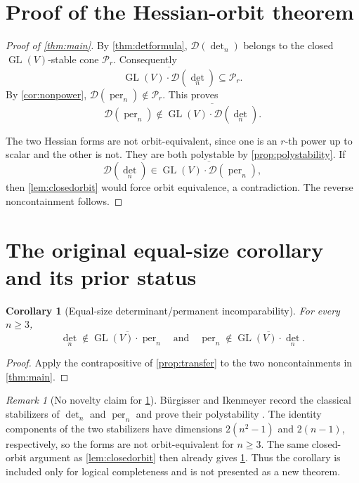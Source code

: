 \documentclass[11pt]{article}
\newtheorem{corollary}[theorem]{Corollary}
\theoremstyle{remark}
\newtheorem{remark}[theorem]{Remark}
\DeclareMathOperator{\per}{per}
\DeclareMathOperator{\GL}{GL}
\newcommand{\Dcal}{\mathcal D}
\begin{document}
\section{Proof of the Hessian-orbit theorem}
\begin{proof}[Proof of \cref{thm:main}]
By \cref{thm:detformula}, $\Dcal(\det_n)$ belongs to the closed $\GL(V)$-stable cone $\mathcal P_r$.  Consequently
\[
 \overline{\GL(V)\cdot\Dcal(\det_n)}\subseteq\mathcal P_r.
\]
By \cref{cor:nonpower}, $\Dcal(\per_n)\notin\mathcal P_r$.  This proves
\[
 \Dcal(\per_n)\notin\overline{\GL(V)\cdot\Dcal(\det_n)}.
\]

The two Hessian forms are not orbit-equivalent, since one is an $r$-th power up to scalar and the other is not.  They are both polystable by \cref{prop:polystability}.  If
\[
 \Dcal(\det_n)\in\overline{\GL(V)\cdot\Dcal(\per_n)},
\]
then \cref{lem:closedorbit} would force orbit equivalence, a contradiction.  The reverse noncontainment follows.
\end{proof}

\section{The original equal-size corollary and its prior status}

\begin{corollary}[Equal-size determinant/permanent incomparability]\label{cor:original}
For every $n\geq3$,
\[
 \det_n\notin\overline{\GL(V)\cdot\per_n}
 \quad\text{and}\quad
 \per_n\notin\overline{\GL(V)\cdot\det_n}.
\]
\end{corollary}
\begin{proof}
Apply the contrapositive of \cref{prop:transfer} to the two noncontainments in \cref{thm:main}.
\end{proof}

\begin{remark}[No novelty claim for \cref{cor:original}]
B\"urgisser and Ikenmeyer record the classical stabilizers of $\det_n$ and $\per_n$ and prove their polystability \cite[Theorems~2.5--2.6 and Section~2.2]{BI}.  The identity components of the two stabilizers have dimensions $2(n^2-1)$ and $2(n-1)$, respectively, so the forms are not orbit-equivalent for $n\geq3$.  The same closed-orbit argument as \cref{lem:closedorbit} then already gives \cref{cor:original}.  Thus the corollary is included only for logical completeness and is not presented as a new theorem.
\end{remark}
\end{document}
